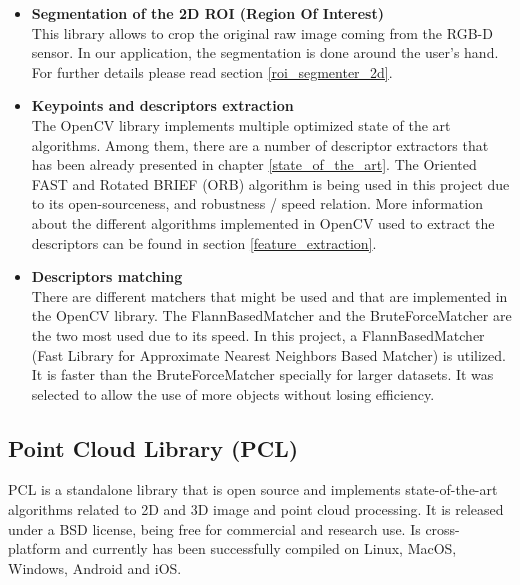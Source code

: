 		\begin{itemize}
		\item\textbf{Segmentation of the 2D ROI (Region Of Interest)\\ }
		This library allows to crop the original raw image coming from the RGB-D sensor. 
		In our application, the segmentation is done around the user's hand. 
		For further details please read section \ref{roi_segmenter_2d}. 
		

		\item\textbf{ {Keypoints and descriptors extraction\\ }}
		 The OpenCV library implements multiple optimized state of the art algorithms. 
		 Among them, there are a number of descriptor extractors that has been already presented in chapter \ref{state_of_the_art}. 
		 The Oriented FAST and Rotated BRIEF (ORB) \cite{orb} algorithm is being used in this project due to its open-sourceness, and robustness / speed relation. 
		 More information about the different algorithms implemented in OpenCV used to extract the descriptors can be found in section \ref{feature_extraction}.


		\item\textbf{ {Descriptors matching\\ } }
		There are different matchers that might be used and that are implemented in the OpenCV library.
		The FlannBasedMatcher and the BruteForceMatcher are the two most used due to its speed. 
		In this project, a FlannBasedMatcher (Fast Library for Approximate Nearest Neighbors Based Matcher) is utilized. 
		It is faster than the BruteForceMatcher specially for larger datasets. 
		It was selected to allow the use of more objects without losing efficiency. 
		\end{itemize}

\newpage
	\subsection{Point Cloud Library (PCL)}
		\label{pcl}
		PCL is a standalone library that is open source and implements state-of-the-art algorithms related to 2D and 3D image and point cloud processing.
		It is released under a BSD license, being free for commercial and research use. Is cross-platform and currently has been successfully compiled on Linux, MacOS, Windows, Android and iOS.
		\\

